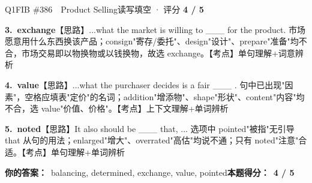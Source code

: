 \documentclass[11pt]{article}
\begin{document}
\begin{qblock}{Q1\quad FIB \#386\ \ Product Selling}{读写填空 · 评分 \textcolor{cAccent}{\bfseries 4 / 5}}
\begin{notebox}
\textbf{3.\ exchange}\quad【思路】...what the market is willing to \_\_\_ for the product. 市场愿意用什么东西换该产品；consign"寄存/委托"、design"设计"、prepare"准备"均不合，市场交易即以物换物或以钱换物，故选 exchange。【考点】单句理解+词意辨析\par\smallskip
\textbf{4.\ value}\quad【思路】...what the purchaser decides is a fair \_\_\_ . 句中已出现"因素"，空格应填表"定价"的名词；addition"增添物"、shape"形状"、content"内容"均不合，选 value"价值、价格"。【考点】上下文理解+单词辨析\par\smallskip
\textbf{5.\ noted}\quad【思路】It also should be \_\_\_ that, ... 选项中 pointed"被指"无引导 that 从句的用法；enlarged"增大"、overrated"高估"均说不通；只有 noted"注意"合适。【考点】单句理解+单词辨析
\end{notebox}
\smallskip
\textbf{你的答案：}\ balancing, determined, exchange, value, {\color{cWrong}pointed}\qquad\textbf{本题得分：}\ {\color{cAccent}\bfseries 4 / 5}
\end{qblock}
\end{document}
